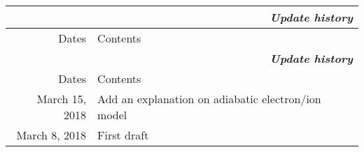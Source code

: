\begin{longtable}{ r | p{12cm} }
  \multicolumn{2}{r}{\bf \textit{Update history}}\\
  \hline Dates & Contents \\ \hline \hline
  \endfirsthead
  \multicolumn{2}{r}{\bf \textit{Update history}}\\
  \hline Dates & Contents \\ \hline \hline
  \endhead
  \hline
  \endfoot
  \hline
  \endlastfoot
  March 15, 2018 & Add an explanation on adiabatic electron/ion model \\
  \hline
  March 8, 2018 & First draft \\
\end{longtable}
